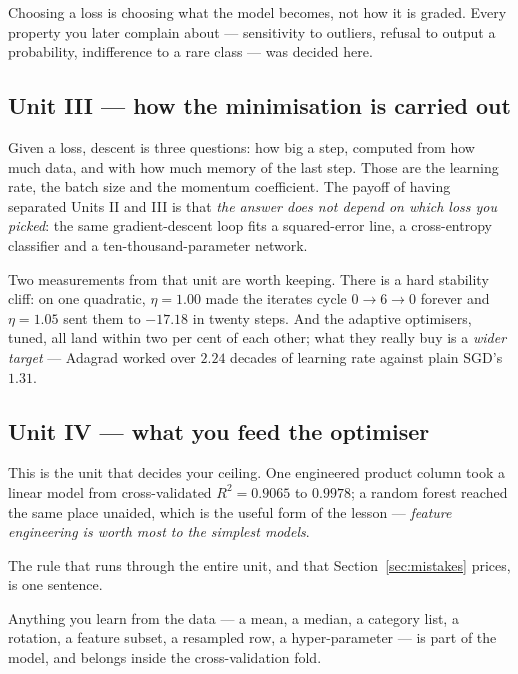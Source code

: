 \documentclass[11pt]{article}
\begin{document}
\begin{keyidea}
Choosing a loss is choosing what the model becomes, not how it is graded.
Every property you later complain about --- sensitivity to outliers, refusal
to output a probability, indifference to a rare class --- was decided here.
\end{keyidea}

\subsection{Unit III --- how the minimisation is carried out}

Given a loss, descent is three questions: how big a step, computed from how
much data, and with how much memory of the last step. Those are the learning
rate, the batch size and the momentum coefficient. The payoff of having
separated Units II and III is that \emph{the answer does not depend on which
loss you picked}: the same gradient-descent loop fits a squared-error line, a
cross-entropy classifier and a ten-thousand-parameter network.

Two measurements from that unit are worth keeping. There is a hard stability
cliff: on one quadratic, $\eta = 1.00$ made the iterates cycle
$0 \to 6 \to 0$ forever and $\eta = 1.05$ sent them to $-17.18$ in twenty
steps. And the adaptive optimisers, tuned, all land within two per cent of
each other; what they really buy is a \emph{wider target} --- Adagrad worked
over $2.24$ decades of learning rate against plain SGD's $1.31$.

\subsection{Unit IV --- what you feed the optimiser}

This is the unit that decides your ceiling. One engineered product column took
a linear model from cross-validated $R^2 = 0.9065$ to $0.9978$; a random
forest reached the same place unaided, which is the useful form of the lesson
--- \emph{feature engineering is worth most to the simplest models}.

The rule that runs through the entire unit, and that Section~\ref{sec:mistakes}
prices, is one sentence.

\begin{keyidea}
Anything you learn from the data --- a mean, a median, a category list, a
rotation, a feature subset, a resampled row, a hyper-parameter --- is part of
the model, and belongs inside the cross-validation fold.
\end{keyidea}
\end{document}
